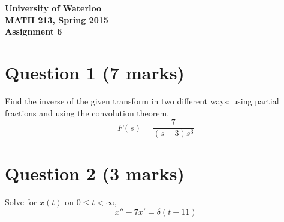 \documentclass[12pt]{article}
\begin{document}
\begin{center}
{\Large\bf University of Waterloo}\\
\vspace{3mm}
{\Large\bf MATH 213, Spring 2015}\\
\vspace{2mm}
{\Large\bf Assignment 6}\\
\end{center}

\section*{Question 1 (7 marks)}
Find the inverse of the given transform in two different ways: using partial fractions and using the convolution theorem. $$F(s) = \frac{7}{(s-3)s^3}$$

\section*{Question 2 (3 marks)}
Solve for $x(t)$ on $0 \leq t < \infty$, $$x''-7x'=\delta(t-11)$$
\end{document}
